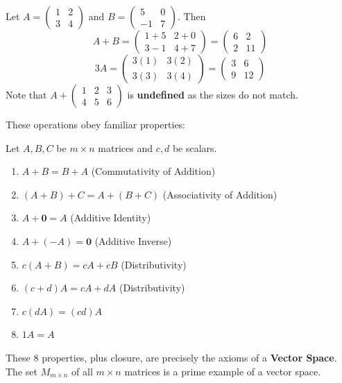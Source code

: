 \documentclass[oneside]{book}
\begin{document}
\begin{example}
Let $A = \begin{pmatrix} 1 & 2 \\ 3 & 4 \end{pmatrix}$ and $B = \begin{pmatrix} 5 & 0 \\ -1 & 7 \end{pmatrix}$.
Then
\[ A+B = \begin{pmatrix} 1+5 & 2+0 \\ 3-1 & 4+7 \end{pmatrix} = \begin{pmatrix} 6 & 2 \\ 2 & 11 \end{pmatrix} \]
\[ 3A = \begin{pmatrix} 3(1) & 3(2) \\ 3(3) & 3(4) \end{pmatrix} = \begin{pmatrix} 3 & 6 \\ 9 & 12 \end{pmatrix} \]
Note that $A + \begin{pmatrix} 1 & 2 & 3 \\ 4 & 5 & 6 \end{pmatrix}$ is \textbf{undefined} as the sizes do not match.
\end{example}

These operations obey familiar properties:
\begin{property}
Let $A, B, C$ be $m \times n$ matrices and $c, d$ be scalars.
\begin{enumerate}
    \item $A+B = B+A$ (Commutativity of Addition)
    \item $(A+B)+C = A+(B+C)$ (Associativity of Addition)
    \item $A + \mathbf{0} = A$ (Additive Identity)
    \item $A + (-A) = \mathbf{0}$ (Additive Inverse)
    \item $c(A+B) = cA + cB$ (Distributivity)
    \item $(c+d)A = cA + dA$ (Distributivity)
    \item $c(dA) = (cd)A$
    \item $1A = A$
\end{enumerate}
\end{property}
\begin{remark}
These 8 properties, plus closure, are precisely the axioms of a \textbf{Vector Space}. The set $M_{m \times n}$ of all $m \times n$ matrices is a prime example of a vector space.
\end{remark}
\end{document}
